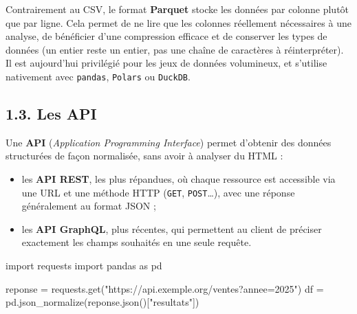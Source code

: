 \documentclass[
  french,
  letterpaper,
  open=any]{scrbook}
\newenvironment{Shaded}{\begin{snugshade}}{\end{snugshade}}
\newcommand{\ImportTok}[1]{\textcolor[rgb]{0.00,0.46,0.62}{#1}}
\newcommand{\NormalTok}[1]{\textcolor[rgb]{0.00,0.23,0.31}{#1}}
\newcommand{\OperatorTok}[1]{\textcolor[rgb]{0.37,0.37,0.37}{#1}}
\newcommand{\StringTok}[1]{\textcolor[rgb]{0.13,0.47,0.30}{#1}}
\providecommand{\tightlist}{%
  \setlength{\itemsep}{0pt}\setlength{\parskip}{0pt}}
\theoremstyle{definition}
\theoremstyle{definition}
\theoremstyle{remark}
\begin{document}
\begin{tcolorbox}[enhanced jigsaw, arc=.35mm, bottomrule=.15mm, bottomtitle=1mm, breakable, colback=white, colbacktitle=quarto-callout-important-color!10!white, colframe=quarto-callout-important-color-frame, coltitle=black, left=2mm, leftrule=.75mm, opacityback=0, opacitybacktitle=0.6, rightrule=.15mm, title=\textcolor{quarto-callout-important-color}{\faExclamation}\hspace{0.5em}{Zoom sur les tendances : le format Parquet}, titlerule=0mm, toprule=.15mm, toptitle=1mm]

Contrairement au CSV, le format \textbf{Parquet} stocke les données par
colonne plutôt que par ligne. Cela permet de ne lire que les colonnes
réellement nécessaires à une analyse, de bénéficier d'une compression
efficace et de conserver les types de données (un entier reste un
entier, pas une chaîne de caractères à réinterpréter). Il est
aujourd'hui privilégié pour les jeux de données volumineux, et s'utilise
nativement avec \texttt{pandas}, \texttt{Polars} ou \texttt{DuckDB}.

\end{tcolorbox}

\subsection{1.3. Les API}\label{les-api}

Une \textbf{API} (\emph{Application Programming Interface}) permet
d'obtenir des données structurées de façon normalisée, sans avoir à
analyser du HTML :

\begin{itemize}
\tightlist
\item
  les \textbf{API REST}, les plus répandues, où chaque ressource est
  accessible via une URL et une méthode HTTP (\texttt{GET},
  \texttt{POST}\ldots), avec une réponse généralement au format JSON ;
\item
  les \textbf{API GraphQL}, plus récentes, qui permettent au client de
  préciser exactement les champs souhaités en une seule requête.
\end{itemize}

\begin{Shaded}
\begin{Highlighting}[]
\ImportTok{import}\NormalTok{ requests}
\ImportTok{import}\NormalTok{ pandas }\ImportTok{as}\NormalTok{ pd}

\NormalTok{reponse }\OperatorTok{=}\NormalTok{ requests.get(}\StringTok{"https://api.exemple.org/ventes?annee=2025"}\NormalTok{)}
\NormalTok{df }\OperatorTok{=}\NormalTok{ pd.json\_normalize(reponse.json()[}\StringTok{"resultats"}\NormalTok{])}
\end{Highlighting}
\end{Shaded}
\end{document}
